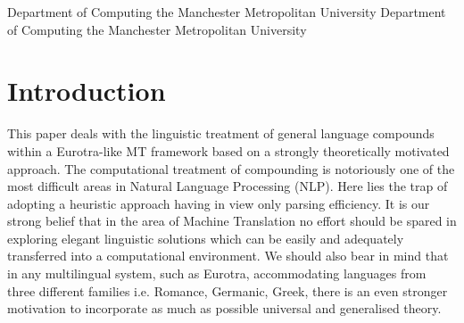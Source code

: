 



\setcounter{page}{45}
\setcounter{巻数}{3}
\setcounter{号数}{1}
\setcounter{年}{1996}
\setcounter{月}{1}

\setcounter{secnumdepth}{2}

\title{}
\author{}
\jkeywords{}




          {Department of Computing the Manchester Metropolitan University}
          {Department of Computing the Manchester Metropolitan University}






\maketitle

\section{Introduction}

This  paper  deals  with the linguistic treatment  of  general 
language compounds within a Eurotra-like MT framework based on  a 
strongly  theoretically  motivated  approach.  The  computational 
treatment of compounding is notoriously one of the most difficult 
areas in Natural Language Processing (NLP). Here lies the trap
 of adopting a heuristic approach 
having  in view only parsing efficiency.  It is our strong belief 
that  in  the area of Machine Translation  no  effort  should  be 
spared  in  exploring elegant linguistic solutions which  can  be 
easily   and   adequately   transferred  into   a   computational 
environment.   We   should   also   bear  in  mind  that  in any 
multilingual   system, such as Eurotra, accommodating   languages
from   three  different families i.e. Romance, Germanic, Greek, 
there is an even  stronger 
motivation  to  incorporate  as much as  possible  universal  and 
generalised theory. 

